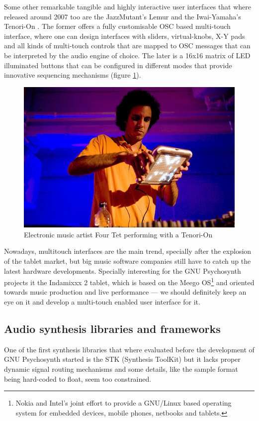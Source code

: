 Some other remarkable tangible and highly interactive user interfaces
that where released around 2007 too are the JazzMutant's Lemur and the
Iwai-Yamaha’s Tenori-On \cite{nishibori06tenorion}. The former offers
a fully customisable OSC based multi-touch interface, where one can
design interfaces with sliders, virtual-knobs, X-Y pads and all kinds
of multi-touch controls that are mapped to OSC messages that can be
interpreted by the audio engine of choice. The later is a 16x16 matrix
of LED illuminated buttons that can be configured in different modes
that provide innovative sequencing mechanisms (figure
\ref{fig:tenorion}).

\begin{figure}[h!]
\centering
\includegraphics[width=.7\textwidth]{pic/tenorion.jpg}
\caption{Electronic music artist Four Tet performing with a Tenori-On}
\label{fig:tenorion}
\end{figure}

Nowadays, multitouch interfaces are the main trend, specially after
the explosion of the tablet market, but big music software companies
still have to catch up the latest hardware developments. Specially
interesting for the GNU Psychosynth projects it the Indamixxx 2
tablet, which is based on the Meego OS\footnote{Nokia and Intel's
  joint effort to provide a GNU/Linux based operating system for
  embedded devices, mobile phones, netbooks and tablets.} and oriented
towards music production and live performance --- we should definitely
keep an eye on it and develop a multi-touch enabled user interface for
it.

\subsection{Audio synthesis libraries and frameworks}

One of the first synthesis libraries that where evaluated before the
development of GNU Psychosynth started is the STK (Synthesis ToolKit)
\cite{scavone05rtmidi} but it lacks proper dynamic signal routing
mechanisms and some details, like the sample format being hard-coded
to float, seem too constrained.

